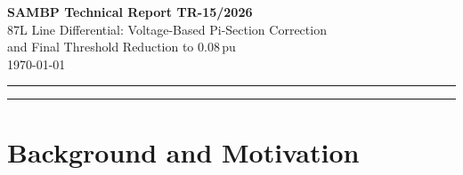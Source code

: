 \documentclass[11pt,a4paper]{article}
\newcommand{\alphafifty}{\alpha_{50}}
\newcommand{\pu}{\,\text{pu}}
\begin{document}

\begin{center}
  {\LARGE\bfseries SAMBP Technical Report TR-15/2026}\\[6pt]
  {\large 87L Line Differential: Voltage-Based Pi-Section Correction\\
          and Final Threshold Reduction to 0.08\,pu}\\[4pt]
  \today
\end{center}

\vspace{4pt}
\noindent\rule{\linewidth}{0.6pt}

\begin{abstract}
SAMBP TR-13 improved 87L high-impedance fault (HIF) sensitivity by replacing
the fixed-amplitude charging compensation with a pre-fault blind correction,
achieving $\alphafifty(\mathrm{ag}) = 0.05$ and lowering the detection
threshold to $I_{\mathrm{thresh}} = 0.12\pu$.  TR-13 identified that further
threshold reduction required voltage measurements at both line terminals
(TR-13 Future Work~1).  This report implements Mode~1: the pi-section
charging current is predicted sample-by-sample from both-end voltage
measurements using a Hilbert-transform-based estimator, with no pre-fault
window requirement.  The residual noise floor is limited only by the
voltage-transformer (PT) accuracy class ($\sigma_{\mathrm{PT}} = 0.001\pu$),
enabling the detection threshold to be safely reduced to $0.08\pu$ with a
tighter sensitivity range ($k_{\mathrm{max}} = 2.0$).  A 200-trial Monte
Carlo sweep gives $\alphafifty(\mathrm{ag}) = 0.03$ and
$\alphafifty(\mathrm{3ph}) = 0.02$, representing a 40\% reduction from the
TR-13 result and a cumulative 57\% reduction from the TR-11 baseline.  The
voltage-based correction requires no changes to the LM estimator or
confidence gate and is backward-compatible with the existing SAMBP 87L
pipeline.
\end{abstract}

\noindent\rule{\linewidth}{0.6pt}

\tableofcontents
\vspace{6pt}

\section{Background and Motivation}
\label{sec:background}
\end{document}
